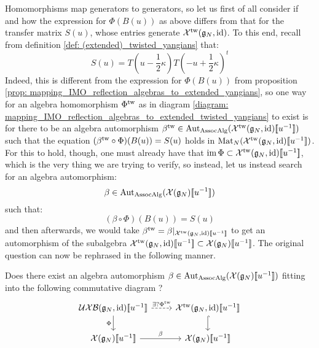         Homomorphisms map generators to generators, so let us first of all consider if and how the expression for $\Phi( B(u) )$ as above differs from that for the transfer matrix $S(u)$, whose entries generate $\mathcal{X}^{\mathrm{tw}}(\mathfrak{g}_N, \mathrm{id})$. To this end, recall from definition \ref{def: (extended)_twisted_yangians} that:
            $$S(u) = T\left(u - \frac12 \kappa\right) T\left(-u + \frac12 \kappa\right)^t$$
        Indeed, this is different from the expression for $\Phi(B(u))$ from proposition \ref{prop: mapping_IMO_reflection_algebras_to_extended_yangians}, so one way for an algebra homomorphism $\Phi^{\mathrm{tw}}$ as in diagram \eqref{diagram: mapping_IMO_reflection_algebras_to_extended_twisted_yangians} to exist is for there to be an algebra automorphism $\beta^{\mathrm{tw}} \in \operatorname{Aut}_{\mathrm{Assoc}\mathrm{Alg}}( \mathcal{X}^{\mathrm{tw}}(\mathfrak{g}_N, \mathrm{id})[\![u^{-1}]\!] )$ such that the equation $(\beta^{\mathrm{tw}} \circ \Phi)( B(u) ) = S(u)$ holds in $\operatorname{Mat}_N(\mathcal{X}^{\mathrm{tw}}(\mathfrak{g}_N, \mathrm{id})[\![u^{-1}]\!])$. For this to hold, though, one must already have that $\operatorname{im} \Phi \subset \mathcal{X}^{\mathrm{tw}}( \mathfrak{g}_N, \mathrm{id} )[\![u^{-1}]\!]$, which is the very thing we are trying to verify, so instead, let us instead search for an algebra automorphism:
            $$\beta \in \operatorname{Aut}_{\mathrm{Assoc}\mathrm{Alg}}( \mathcal{X}(\mathfrak{g}_N)[\![u^{-1}]\!] )$$
        such that:
            \begin{equation} \label{equation: B_matrix_S_matrix_compatibility}
                (\beta \circ \Phi)( B(u) ) = S(u)
            \end{equation}
        and then afterwards, we would take $\beta^{\mathrm{tw}} = \beta|_{ \mathcal{X}^{\mathrm{tw}}( \mathfrak{g}_N, \mathrm{id} )[\![u^{-1}]\!] }$ to get an automorphism of the subalgebra $\mathcal{X}^{\mathrm{tw}}(\mathfrak{g}_N, \mathrm{id})[\![u^{-1}]\!] \subset \mathcal{X}(\mathfrak{g}_N)[\![u^{-1}]\!]$. The original question can now be rephrased in the following manner.
        \begin{question}
            Does there exist an algebra automorphism $\beta \in \operatorname{Aut}_{\mathrm{Assoc}\mathrm{Alg}}( \mathcal{X}(\mathfrak{g}_N)[\![u^{-1}]\!] )$ fitting into the following commutative diagram ?
                \begin{equation} \label{diagram: mapping_IMO_reflection_algebras_to_extended_twisted_yangians_via_untwisted_automorphisms}
                    \begin{tikzcd}
                    {\UXB(\g_N, \id)[\![u^{-1}]\!]} & {\calX^{\tw}(\g_N, \id)[\![u^{-1}]\!]} \\
                    {\calX(\g_N)[\![u^{-1}]\!]} & {\calX(\g_N)[\![u^{-1}]\!]}
                    \arrow["{\exists ? \Phi^{\tw}}", dashed, from=1-1, to=1-2]
                    \arrow["\Phi"', from=1-1, to=2-1]
                    \arrow[hook, from=1-2, to=2-2]
                    \arrow["\beta", from=2-1, to=2-2]
                    \end{tikzcd}
                \end{equation}
        \end{question}
        
